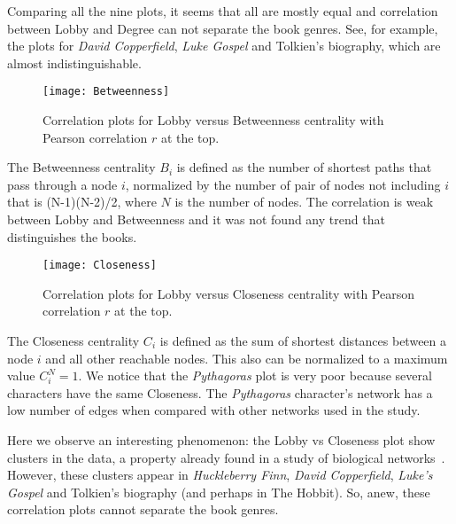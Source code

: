\documentclass[review]{elsarticle}
\begin{document}
Comparing all the nine plots, it seems that all are mostly
equal and correlation between Lobby and Degree can not separate
the book genres. See, for example, the plots for
\emph{David Copperfield}, \emph{Luke Gospel} and Tolkien's biography, which are
almost indistinguishable.

\begin{figure}[ht]
\centering
\texttt{[image: Betweenness]}
\caption{\label{FigB} Correlation plots for Lobby 
versus Betweenness centrality 
with Pearson correlation $r$ at the top.}
\end{figure}

The Betweenness centrality $B_i$ is  defined 
as the number of shortest paths that 
pass through a node $i$, normalized 
by the number of pair of nodes not including $i$ that 
is (N-1)(N-2)/2, where $N$ is the number of nodes. 
The correlation is weak between
Lobby and Betweenness and it was not found any trend 
that distinguishes the books.

\begin{figure}[ht]
\centering
\texttt{[image: Closeness]}
\caption{\label{FigC} Correlation plots for  
Lobby versus Closeness centrality 
with Pearson correlation $r$ at the top.}
\end{figure}

The Closeness centrality $C_i$ is  defined as 
the sum of shortest distances 
between a node $i$ and all other reachable nodes.
This also can be normalized to a maximum value $C^N_i=1$.
We notice that the \emph{Pythagoras} plot is very poor because several
characters have the same Closeness. The \emph{Pythagoras} character's 
network has a low number of edges when compared with other networks 
used in the study.

Here we observe an interesting phenomenon: the Lobby vs Closeness plot
show clusters in the data, a property already found in a study
of biological networks~\cite{campiteli2013lobby}. However,
these clusters appear in \emph{Huckleberry Finn}, \emph{David Copperfield},
\emph{Luke's Gospel} and Tolkien's biography (and perhaps in The 
Hobbit). So, anew, these correlation plots cannot separate the
book genres.

\end{document}
